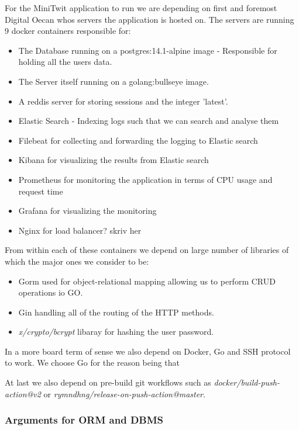 For the MiniTwit application to run we are depending on first and foremost Digital Oecan whos servers the application is 
hosted on. The servers are running 9 docker containers responsible for: 
\begin{itemize}
    \item The Database running on a postgres:14.1-alpine image - Responsible for holding all the users data.
    \item The Server itself running on a golang:bullseye image.
    \item A reddis server for storing sessions and the integer 'latest'.
    \item Elastic Search - Indexing logs such that we can search and analyse them
    \item Filebeat for collecting and forwarding the logging to Elastic search
    \item Kibana for visualizing the results from Elastic search
    \item Prometheus for monitoring the application in terms of CPU usage and request time
    \item Grafana for visualizing the monitoring
    \item Nginx for load balancer? skriv her
\end{itemize}

From within each of these containers we depend on large number of libraries of which the major ones we consider to be:
\begin{itemize}
    \item Gorm used for object-relational mapping allowing us to perform CRUD operations io GO.
    \item Gin handling all of the routing of the HTTP methods.
    \item \textit{x/crypto/bcrypt} libaray for hashing the user password.
\end{itemize}

In a more board term of sense we also depend on Docker, Go and SSH protocol to work. We choose Go for the reason being 
that  

At last we also depend on pre-build git workflows such as \textit{docker/build-push-action@v2} or \textit{rymndhng/release-on-push-action@master}.
\subsubsection{Arguments for ORM and DBMS}

